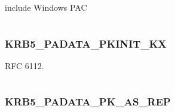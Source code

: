 \documentclass[letterpaper,10pt,english]{sphinxmanual}
\begin{document}
\begin{fulllineitems}
\label{appdev/refs/macros/KRB5_PADATA_PAC_REQUEST:KRB5_PADATA_PAC_REQUEST}
\end{fulllineitems}


include Windows PAC

\begin{tabulary}{\linewidth}{|L|L|}
\hline

 & 
\\\hline
\end{tabulary}



\subsubsection{KRB5\_PADATA\_PKINIT\_KX}
\label{appdev/refs/macros/KRB5_PADATA_PKINIT_KX:krb5-padata-pkinit-kx}\label{appdev/refs/macros/KRB5_PADATA_PKINIT_KX:krb5-padata-pkinit-kx-data}\label{appdev/refs/macros/KRB5_PADATA_PKINIT_KX::doc}

\begin{fulllineitems}
\label{appdev/refs/macros/KRB5_PADATA_PKINIT_KX:KRB5_PADATA_PKINIT_KX}
\end{fulllineitems}


RFC 6112.

\begin{tabulary}{\linewidth}{|L|L|}
\hline

 & 
\\\hline
\end{tabulary}



\subsubsection{KRB5\_PADATA\_PK\_AS\_REP}
\label{appdev/refs/macros/KRB5_PADATA_PK_AS_REP:krb5-padata-pk-as-rep-data}\label{appdev/refs/macros/KRB5_PADATA_PK_AS_REP:krb5-padata-pk-as-rep}\label{appdev/refs/macros/KRB5_PADATA_PK_AS_REP::doc}

\begin{fulllineitems}
\label{appdev/refs/macros/KRB5_PADATA_PK_AS_REP:KRB5_PADATA_PK_AS_REP}
\end{fulllineitems}
\end{document}
